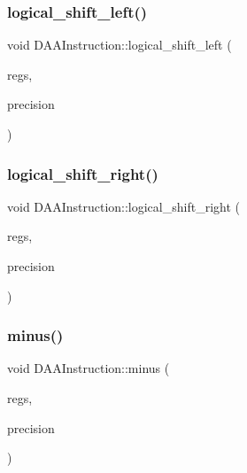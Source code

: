\mbox{\label{classDAAInstruction_a72e52e2c935ee6ab3d494973a5142ebd}} 
\subsubsection{\texorpdfstring{logical\+\_\+shift\+\_\+left()}{logical\_shift\_left()}}
{\footnotesize\ttfamily void D\+A\+A\+Instruction\+::logical\+\_\+shift\+\_\+left (\begin{DoxyParamCaption}\item[{\hyperlink{DAAInstruction_8h_af0fae93a861de9cf37988d5673cac523}{reg\+Table} \&}]{regs,  }\item[{\hyperlink{DAAInstruction_8h_a0e8cae02815a5f8adc750122d790b455}{reg\+Precision\+Table} \&}]{precision }\end{DoxyParamCaption})}

\mbox{\label{classDAAInstruction_a8b488a5cdf1e29c351abdc29cfe5d6a3}} 
\subsubsection{\texorpdfstring{logical\+\_\+shift\+\_\+right()}{logical\_shift\_right()}}
{\footnotesize\ttfamily void D\+A\+A\+Instruction\+::logical\+\_\+shift\+\_\+right (\begin{DoxyParamCaption}\item[{\hyperlink{DAAInstruction_8h_af0fae93a861de9cf37988d5673cac523}{reg\+Table} \&}]{regs,  }\item[{\hyperlink{DAAInstruction_8h_a0e8cae02815a5f8adc750122d790b455}{reg\+Precision\+Table} \&}]{precision }\end{DoxyParamCaption})}

\mbox{\label{classDAAInstruction_ad2828825e913269a17a24391bab25bfe}} 
\subsubsection{\texorpdfstring{minus()}{minus()}}
{\footnotesize\ttfamily void D\+A\+A\+Instruction\+::minus (\begin{DoxyParamCaption}\item[{\hyperlink{DAAInstruction_8h_af0fae93a861de9cf37988d5673cac523}{reg\+Table} \&}]{regs,  }\item[{\hyperlink{DAAInstruction_8h_a0e8cae02815a5f8adc750122d790b455}{reg\+Precision\+Table} \&}]{precision }\end{DoxyParamCaption})}


